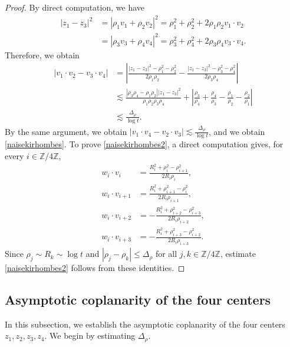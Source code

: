 \documentclass[10pt,a4paper]{amsart}
\numberwithin{equation}{section}
\begin{document}
\begin{proof}
By direct computation, we have
\begin{align*}
\left|z_1-z_3\right|^2&=\left|\rho_1v_1+\rho_2v_2\right|^2=\rho_1^2+\rho_2^2+2\rho_1\rho_2v_1\cdot v_2
\\
&=\left|\rho_3v_3+\rho_4v_4\right|^2=\rho_3^2+\rho_4^2+2\rho_3\rho_4v_3\cdot v_4.
\end{align*}
Therefore, we obtain
\begin{align*}
\left|v_1\cdot v_2-v_3\cdot v_4\right|&=\left|\frac{|z_1-z_3|^2-\rho_1^2-\rho_2^2}{2\rho_1\rho_2}-\frac{|z_1-z_3|^2-\rho_3^2-\rho_4^2}{2\rho_3\rho_4}\right|
\\
&\lesssim \frac{\left|\rho_3\rho_4-\rho_1\rho_2\right|\left|z_1-z_3\right|^2}{\rho_1\rho_2\rho_3\rho_4}+\left|\frac{\rho_3}{\rho_4}+\frac{\rho_4}{\rho_3}-\frac{\rho_1}{\rho_2}-\frac{\rho_2}{\rho_1}\right|
\\
&\lesssim \frac{\Delta_\rho}{\log{t}}.
\end{align*}
By the same argument, we obtain $\left|v_1\cdot v_4-v_2\cdot v_3\right|\lesssim \frac{\Delta_{\rho}}{\log{t}}$, and we obtain \eqref{naisekirhombes}. To prove \eqref{naisekirhombes2}, a direct computation gives, for every
$i\in\mathbb{Z}/4\mathbb{Z}$,
\begin{align*}
w_i\cdot v_i&=\frac{R_i^2+\rho_i^2-\rho_{i+1}^2}{2R_i\rho_i},
\\
w_i\cdot v_{i+1}&=\frac{R_i^2+\rho_{i+1}^2-\rho_i^2}{2R_i\rho_{i+1}},
\\
w_i\cdot v_{i+2}&=-\frac{R_i^2+\rho_{i+2}^2-\rho_{i+3}^2}{2R_i\rho_{i+2}},
\\
w_i\cdot v_{i+3}&=-\frac{R_i^2+\rho_{i+3}^2-\rho_{i+2}^2}{2R_i\rho_{i+3}}.
\end{align*}
Since $\rho_j\sim R_k\sim\log t$ and $|\rho_j-\rho_k|\leq\Delta_{\rho}$ for all $j,k\in\mathbb{Z}/4\mathbb{Z}$, estimate \eqref{naisekirhombes2} follows from these identities.
\end{proof}



\subsection{Asymptotic coplanarity of the four centers}

In this subsection, we establish the asymptotic coplanarity of the four centers $z_1,z_2,z_3,z_4$. We begin by estimating $\Delta_{\rho}$.
\end{document}
